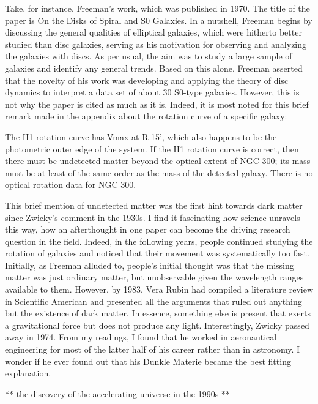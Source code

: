 Take, for instance, Freeman's work, which was published in 1970. The title of the paper is On the Disks of Spiral and S0 Galaxies. In a nutshell, Freeman begins by discussing the general qualities of elliptical galaxies, which were hitherto better studied than disc galaxies, serving as his motivation for observing and analyzing the galaxies with discs. As per usual, the aim was to study a large sample of galaxies and identify any general trends. Based on this alone, Freeman asserted that the novelty of his work was developing and applying the theory of disc dynamics to interpret a data set of about 30 S0-type galaxies. However, this is not why the paper is cited as much as it is. Indeed, it is most noted for this brief remark made in the appendix about the rotation curve of a specific galaxy: 

The H1 rotation curve has Vmax at R 15', which also happens to be the photometric outer edge of the system. If the H1 rotation curve is correct, then there must be undetected matter beyond the optical extent of NGC 300; its mass must be at least of the same order as the mass of the detected galaxy. There is no optical rotation data for NGC 300.

This brief mention of undetected matter was the first hint towards dark matter since Zwicky's comment in the 1930s. I find it fascinating how science unravels this way, how an afterthought in one paper can become the driving research question in the field. Indeed, in the following years, people continued studying the rotation of galaxies and noticed that their movement was systematically too fast. Initially, as Freeman alluded to, people's initial thought was that the missing matter was just ordinary matter, but unobservable given the wavelength ranges available to them. However, by 1983, Vera Rubin had compiled a literature review in Scientific American and presented all the arguments that ruled out anything but the existence of dark matter. In essence, something else is present that exerts a gravitational force but does not produce any light. Interestingly, Zwicky passed away in 1974. From my readings, I found that he worked in aeronautical engineering for most of the latter half of his career rather than in astronomy. I wonder if he ever found out that his Dunkle Materie became the best fitting explanation. 


** the discovery of the accelerating universe in the 1990s ** 

